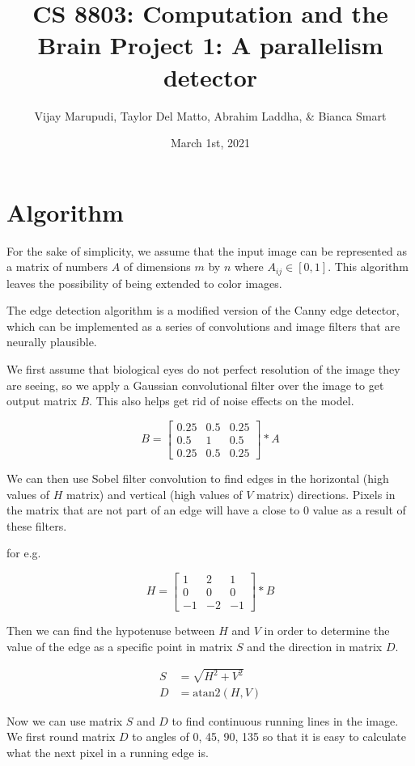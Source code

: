 \documentclass[11pt]{article}
\title{CS 8803: Computation and the Brain Project 1: A parallelism detector}
\author{Vijay Marupudi, Taylor Del Matto, Abrahim Laddha, \& Bianca Smart}
\date{March 1st, 2021}
\begin{document}
\maketitle

\section{Algorithm}

For the sake of simplicity, we assume that the input image can be represented
as a matrix of numbers $A$ of dimensions $m$ by $n$ where $A_{ij} \in [0, 1]$. This algorithm leaves the possibility of being extended to color images.

The edge detection algorithm is a modified version of the Canny edge detector, which can be implemented as a series of convolutions and image filters that are neurally plausible.

We first assume that biological eyes do not perfect resolution of the image
they are seeing, so we apply a Gaussian convolutional filter over the image to
get output matrix $B$. This also helps get rid of noise effects on the model.

$$B = \begin{bmatrix}
  0.25 & 0.5 &  0.25 \\
  0.5 & 1 & 0.5 \\
  0.25 & 0.5 & 0.25
\end{bmatrix} * A$$

We can then use Sobel filter convolution to find edges in the horizontal (high values of $H$ matrix) and vertical (high values of $V$ matrix) directions. Pixels in the matrix that are not part of an edge will have a close to 0 value as a result of these filters.

for e.g.

\[
H = \begin{bmatrix}
  1 & 2 & 1 \\
  0 & 0 & 0 \\
  -1 & -2 & -1
\end{bmatrix} * B
\]

Then we can find the hypotenuse between $H$ and $V$ in order to determine the value of the edge as a specific point in matrix $S$ and the direction in matrix $D$.

\begin{align*}
  S &= \sqrt{H^2 + V^2} \\
  D &= \text{atan2}(H, V)
\end{align*}

Now we can use matrix $S$ and $D$ to find continuous running lines in the image. We first round matrix $D$ to angles of 0, 45, 90, 135 so that it is easy to calculate what the next pixel in a running edge is.
\end{document}
